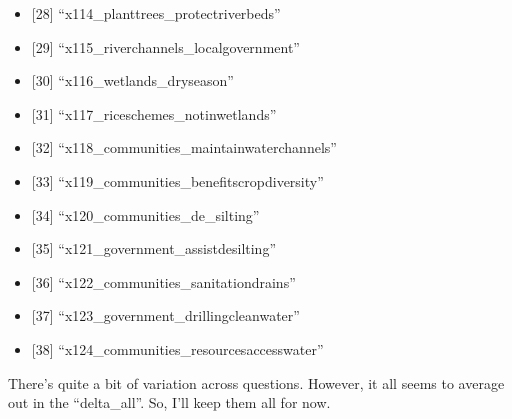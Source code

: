 \documentclass[12pt,]{article}
\providecommand{\tightlist}{%
\setlength{\itemsep}{0pt}\setlength{\parskip}{0pt}}
\begin{document}
\begin{itemize}
\tightlist
\item
  {[}28{]} ``x114\_planttrees\_protectriverbeds''\\
\item
  {[}29{]} ``x115\_riverchannels\_localgovernment''\\
\item
  {[}30{]} ``x116\_wetlands\_dryseason''\\
\item
  {[}31{]} ``x117\_riceschemes\_notinwetlands''\\
\item
  {[}32{]} ``x118\_communities\_maintainwaterchannels''\\
\item
  {[}33{]} ``x119\_communities\_benefitscropdiversity''\\
\item
  {[}34{]} ``x120\_communities\_de\_silting''\\
\item
  {[}35{]} ``x121\_government\_assistdesilting''\\
\item
  {[}36{]} ``x122\_communities\_sanitationdrains''\\
\item
  {[}37{]} ``x123\_government\_drillingcleanwater''\\
\item
  {[}38{]} ``x124\_communities\_resourcesaccesswater''
\end{itemize}

There's quite a bit of variation across questions. However, it all seems
to average out in the ``delta\_all''. So, I'll keep them all for now.
\end{document}
